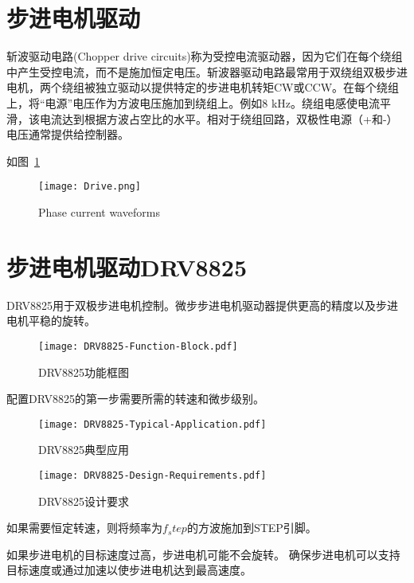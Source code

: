 \section{步进电机驱动}

斩波驱动电路(Chopper drive circuits)称为受控电流驱动器，因为它们在每个绕组中产生受控电流，而不是施加恒定电压。斩波器驱动电路最常用于双绕组双极步进电机，两个绕组被独立驱动以提供特定的步进电机转矩CW或CCW。在每个绕组上，将“电源”电压作为方波电压施加到绕组上。例如8 kHz。绕组电感使电流平滑，该电流达到根据方波占空比的水平。相对于绕组回路，双极性电源（+和-）电压通常提供给控制器。

如图~\ref{fig:Phase-current}

\begin{figure}[htbp]
    \centering
    \texttt{[image: Drive.png]}
    \caption{Phase current waveforms}
    \label{fig:Phase-current}
\end{figure}

\section{步进电机驱动DRV8825}

DRV8825用于双极步进电机控制。微步步进电机驱动器提供更高的精度以及步进电机平稳的旋转。

\begin{figure}[htbp]
    \centering
    \texttt{[image: DRV8825-Function-Block.pdf]}
    \caption{DRV8825功能框图}
    \label{fig:DRV8825-Function-Block}
\end{figure}

配置DRV8825的第一步需要所需的转速和微步级别。

\begin{figure}[htbp]
    \centering
    \texttt{[image: DRV8825-Typical-Application.pdf]}
    \caption{DRV8825典型应用}
    \label{fig:DRV8825-Typical-Application}
\end{figure}


\begin{figure}[htbp]
    \centering
    \texttt{[image: DRV8825-Design-Requirements.pdf]}
    \caption{DRV8825设计要求}
    \label{fig:DRV8825-Design-Requirements}
\end{figure}

如果需要恒定转速，则将频率为$f_step$的方波施加到STEP引脚。

如果步进电机的目标速度过高，步进电机可能不会旋转。 确保步进电机可以支持目标速度或通过加速以使步进电机达到最高速度。

